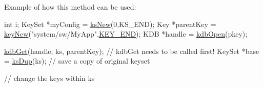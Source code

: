 \begin{DoxyParagraph}{Example of how this method can be used\-:}

\begin{DoxyCode}
\textcolor{keywordtype}{int} i;
KeySet *myConfig = \hyperlink{group__keyset_ga671e1aaee3ae9dc13b4834a4ddbd2c3c}{ksNew}(0,KS\_END);
Key *parentKey = \hyperlink{group__key_gad23c65b44bf48d773759e1f9a4d43b89}{keyNew}(\textcolor{stringliteral}{"system/sw/MyApp"},\hyperlink{group__key_gga91fb3178848bd682000958089abbaf40aa8adb6fcb92dec58fb19410eacfdd403}{KEY\_END});
KDB *handle = \hyperlink{group__kdb_ga6808defe5870f328dd17910aacbdc6ca}{kdbOpen}(pkey);

\hyperlink{group__kdb_ga28e385fd9cb7ccfe0b2f1ed2f62453a1}{kdbGet}(handle, ks, parentKey); \textcolor{comment}{// kdbGet needs to be called first!}
KeySet *base = \hyperlink{group__keyset_gac59e4b328245463f1451f68d5106151c}{ksDup}(ks); \textcolor{comment}{// save a copy of original keyset}

\textcolor{comment}{// change the keys within ks}


\end{DoxyCode}
\end{DoxyParagraph}
